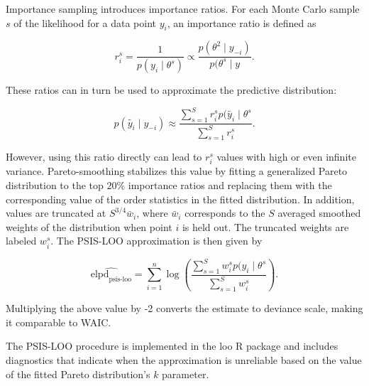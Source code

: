 Importance sampling introduces importance ratios. For each Monte Carlo sample $s$ of the likelihood for a data point $y_i$, an importance ratio is defined as

\begin{equation}
r^s_i = \frac{1}{p(y_i \mid \theta^s)} \propto \frac{p(\theta^2 \mid y_{-i})}{p(\theta^s \mid y}.
\end{equation}

These ratios can in turn be used to approximate the predictive distribution:

\begin{equation}
p(\tilde{y_i} \mid y_{-i}) \approx \frac{\sum_{s=1}^S r_i^s p(\tilde{y_i}\mid \theta^s}{\sum_{s=1}^S r_i^s}.
\end{equation}

However, using this ratio directly can lead to $r_i^s$ values with high or even infinite variance. Pareto-smoothing stabilizes this value by fitting a generalized Pareto distribution to the top $20\%$ importance ratios and replacing them with the corresponding value of the order statistics in the fitted distribution. In addition, values are truncated at $S^{3/4}\bar w_i$, where $\bar w_i$ corresponds to the $S$ averaged smoothed weights of the distribution when point $i$ is held out. The truncated weights are labeled $w_i^s$. The PSIS-LOO approximation is then given by

\begin{equation}
\hat{\text{elpd}_{\text{psis-loo}}} = \sum_{i=1}^n \log \left( \frac{\sum_{s=1}^S w_i^s p(y_i \mid \theta^s}{\sum_{s=1}^S w_i^s} \right).
\end{equation}

Multiplying the above value by -2 converts the estimate to deviance scale, making it comparable to WAIC.

The PSIS-LOO procedure is implemented in the loo R package and includes diagnostics that indicate when the approximation is unreliable based on the value of the fitted Pareto distribution's $k$ parameter.